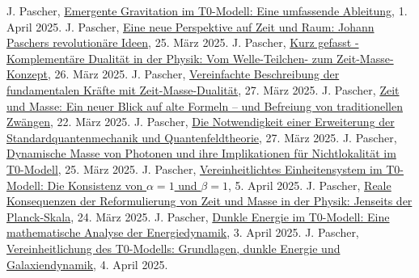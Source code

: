 \documentclass[12pt,a4paper]{article}
\begin{document}
\begin{thebibliography}{99}
 J. Pascher, \href{https://github.com/jpascher/T0-Time-Mass-Duality/tree/main/2/pdf/Deutsch/EmergentGravT0.pdf}{Emergente Gravitation im T0-Modell: Eine umfassende Ableitung}, 1. April 2025.
 J. Pascher, \href{https://github.com/jpascher/T0-Time-Mass-Duality/tree/main/2/pdf/Deutsch/ZeitRaumPascher.pdf}{Eine neue Perspektive auf Zeit und Raum: Johann Paschers revolutionäre Ideen}, 25. März 2025.
 J. Pascher, \href{https://github.com/jpascher/T0-Time-Mass-Duality/tree/main/2/pdf/Deutsch/KurzKomplementDualPhysik.pdf}{Kurz gefasst - Komplementäre Dualität in der Physik: Vom Welle-Teilchen- zum Zeit-Masse-Konzept}, 26. März 2025.
 J. Pascher, \href{https://github.com/jpascher/T0-Time-Mass-Duality/tree/main/2/pdf/Deutsch/VierKraefteZeitMasse.pdf}{Vereinfachte Beschreibung der fundamentalen Kräfte mit Zeit-Masse-Dualität}, 27. März 2025.
 J. Pascher, \href{https://github.com/jpascher/T0-Time-Mass-Duality/tree/main/2/pdf/Deutsch/ZeitMasseNeuerBlick.pdf}{Zeit und Masse: Ein neuer Blick auf alte Formeln – und Befreiung von traditionellen Zwängen}, 22. März 2025.
 J. Pascher, \href{https://github.com/jpascher/T0-Time-Mass-Duality/tree/main/2/pdf/Deutsch/NotwendigkeitQMErweiterung.pdf}{Die Notwendigkeit einer Erweiterung der Standardquantenmechanik und Quantenfeldtheorie}, 27. März 2025.
 J. Pascher, \href{https://github.com/jpascher/T0-Time-Mass-Duality/tree/main/2/pdf/Deutsch/DynMassePhotonenNichtlokal.pdf}{Dynamische Masse von Photonen und ihre Implikationen für Nichtlokalität im T0-Modell}, 25. März 2025.
 J. Pascher, \href{https://github.com/jpascher/T0-Time-Mass-Duality/tree/main/2/pdf/Deutsch/Alpha1Beta1Konsistenz.pdf}{Vereinheitlichtes Einheitensystem im T0-Modell: Die Konsistenz von $\alpha = 1$ und $\beta = 1$}, 5. April 2025.
 J. Pascher, \href{https://github.com/jpascher/T0-Time-Mass-Duality/tree/main/2/pdf/Deutsch/JenseitsPlanck.pdf}{Reale Konsequenzen der Reformulierung von Zeit und Masse in der Physik: Jenseits der Planck-Skala}, 24. März 2025.
 J. Pascher, \href{https://github.com/jpascher/T0-Time-Mass-Duality/tree/main/2/pdf/Deutsch/MathEnergiedynamik.pdf}{Dunkle Energie im T0-Modell: Eine mathematische Analyse der Energiedynamik}, 3. April 2025.
 J. Pascher, \href{https://github.com/jpascher/T0-Time-Mass-Duality/tree/main/2/pdf/Deutsch/T0VereinheitlichungDEGal.pdf}{Vereinheitlichung des T0-Modells: Grundlagen, dunkle Energie und Galaxiendynamik}, 4. April 2025.

\end{thebibliography}
\end{document}
